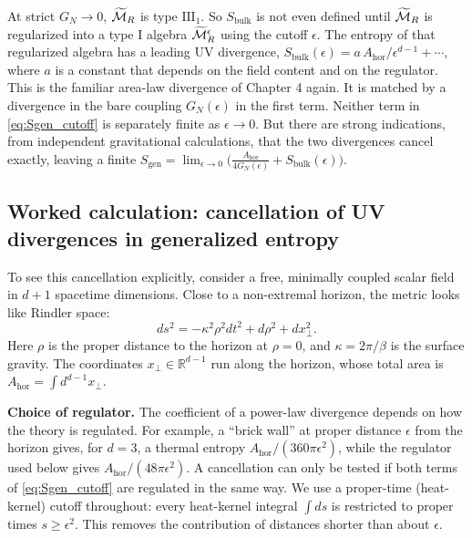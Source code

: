 At strict $G_N\to0$, $\widetilde{\mathcal{M}}_R$ is type $\mathrm{III}_1$. So $S_{\text{bulk}}$ is not even defined until
$\widetilde{\mathcal{M}}_R$ is regularized into a type I algebra $\widetilde{\mathcal{M}}_R^\epsilon$ using the cutoff $\epsilon$.
The entropy of that regularized algebra has a leading UV divergence,
$S_{\text{bulk}}(\epsilon)=a\,A_{\text{hor}}/\epsilon^{d-1}+\cdots$, where $a$ is a constant that depends on
the field content and on the regulator. This is the familiar area-law divergence of Chapter 4 again. It is
matched by a divergence in the bare coupling $G_N(\epsilon)$ in the first term. Neither term in
\eqref{eq:Sgen_cutoff} is separately finite as $\epsilon\to0$. But there are strong indications, from
independent gravitational calculations, that the two divergences cancel exactly, leaving a finite
$S_{\text{gen}}=\lim_{\epsilon\to0}\big(\tfrac{A_{\text{hor}}}{4G_N(\epsilon)}+S_{\text{bulk}}(\epsilon)\big)$.

\subsection*{Worked calculation: cancellation of UV divergences in generalized entropy}

To see this cancellation explicitly, consider a free, minimally coupled scalar field in $d+1$ spacetime
dimensions. Close to a non-extremal horizon, the metric looks like Rindler space:
\[
ds^2 = -\kappa^2 \rho^2 dt^2 + d\rho^2 + dx_\perp^2 .
\]
Here $\rho$ is the proper distance to the horizon at $\rho = 0$, and $\kappa = 2\pi/\beta$ is the surface
gravity. The coordinates $x_\perp \in \mathbb{R}^{d-1}$ run along the horizon, whose total area is
$A_{\text{hor}} = \int d^{d-1}x_\perp$.

\textbf{Choice of regulator.} The coefficient of a power-law divergence depends on how the theory is
regulated. For example, a ``brick wall'' at proper distance $\epsilon$ from the horizon gives, for $d=3$, a
thermal entropy $A_{\text{hor}}/(360\pi\epsilon^2)$, while the regulator used below gives
$A_{\text{hor}}/(48\pi\epsilon^2)$. A cancellation can only be tested if both terms of \eqref{eq:Sgen_cutoff}
are regulated in the same way. We use a proper-time (heat-kernel) cutoff throughout: every heat-kernel integral
$\int ds$ is restricted to proper times $s\ge\epsilon^2$. This removes the contribution of distances shorter than
about $\epsilon$.

